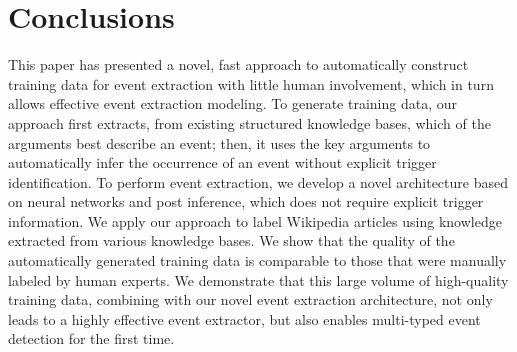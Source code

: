 \section{Conclusions}
This paper has presented a novel, fast approach to automatically construct training data for event extraction with little human
involvement, which in turn allows effective event extraction modeling. To generate training data, our approach first extracts, from
existing structured knowledge bases, which of the arguments best describe an event; then, it uses the key arguments to automatically infer
the occurrence of an event without explicit trigger identification. To perform event extraction, we develop a novel architecture based on
neural networks and post inference, which does not require explicit trigger information. We apply our approach to label Wikipedia articles
using knowledge extracted from various knowledge bases. We show that the quality of the automatically generated training data is comparable
to those that were manually labeled by human experts. We demonstrate that this large volume of high-quality training data, combining with
 our novel event extraction architecture, not only leads to a highly effective event extractor, but also enables multi-typed event
detection for the first time.




%
